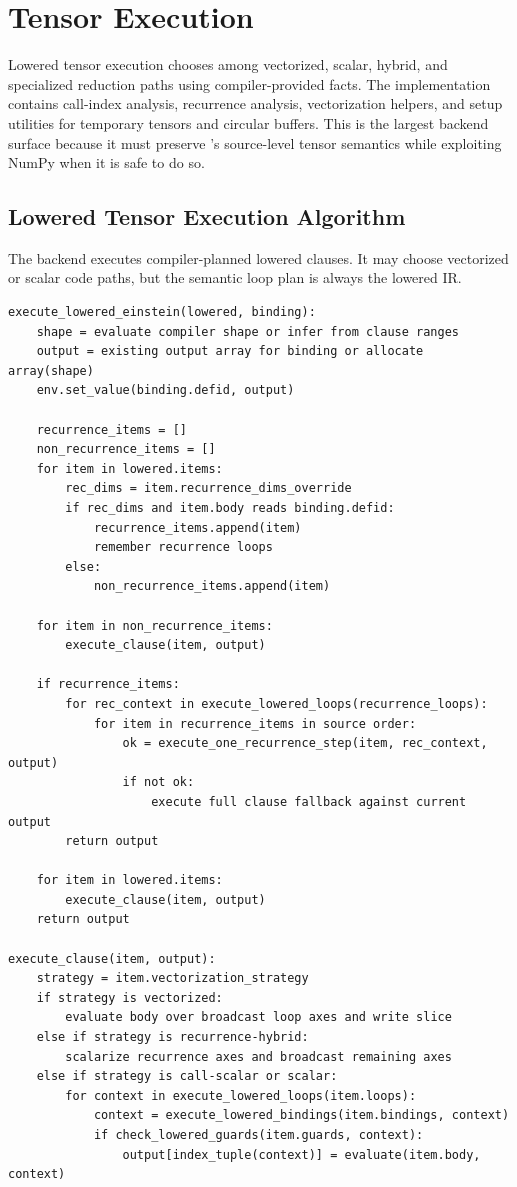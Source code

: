 \section{Tensor Execution}

Lowered tensor execution chooses among vectorized, scalar, hybrid, and
specialized reduction paths using compiler-provided facts. The implementation
contains call-index analysis, recurrence analysis, vectorization helpers, and
setup utilities for temporary tensors and circular buffers. This is the largest
backend surface because it must preserve \einlang{}'s source-level tensor
semantics while exploiting NumPy when it is safe to do so.

\subsection{Lowered Tensor Execution Algorithm}

The backend executes compiler-planned lowered clauses. It may choose vectorized
or scalar code paths, but the semantic loop plan is always the lowered IR.

\begin{lstlisting}[style=pythoncode,caption={Executing a lowered Einstein value.}]
execute_lowered_einstein(lowered, binding):
    shape = evaluate compiler shape or infer from clause ranges
    output = existing output array for binding or allocate array(shape)
    env.set_value(binding.defid, output)

    recurrence_items = []
    non_recurrence_items = []
    for item in lowered.items:
        rec_dims = item.recurrence_dims_override
        if rec_dims and item.body reads binding.defid:
            recurrence_items.append(item)
            remember recurrence loops
        else:
            non_recurrence_items.append(item)

    for item in non_recurrence_items:
        execute_clause(item, output)

    if recurrence_items:
        for rec_context in execute_lowered_loops(recurrence_loops):
            for item in recurrence_items in source order:
                ok = execute_one_recurrence_step(item, rec_context, output)
                if not ok:
                    execute full clause fallback against current output
        return output

    for item in lowered.items:
        execute_clause(item, output)
    return output

execute_clause(item, output):
    strategy = item.vectorization_strategy
    if strategy is vectorized:
        evaluate body over broadcast loop axes and write slice
    else if strategy is recurrence-hybrid:
        scalarize recurrence axes and broadcast remaining axes
    else if strategy is call-scalar or scalar:
        for context in execute_lowered_loops(item.loops):
            context = execute_lowered_bindings(item.bindings, context)
            if check_lowered_guards(item.guards, context):
                output[index_tuple(context)] = evaluate(item.body, context)
\end{lstlisting}


